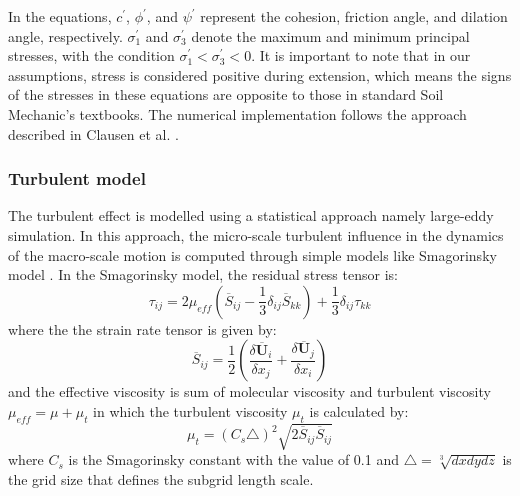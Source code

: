 \documentclass[preprint,12pt]{elsarticle}
\begin{document}
%
%
In the equations, $c^{\prime}$, $\phi^{\prime}$, and $\psi^{\prime}$ represent the cohesion, friction angle, and dilation angle, respectively. $\sigma_1^{\prime}$ and $\sigma_3^{\prime}$ denote the maximum and minimum principal stresses, with the condition $\sigma_1^{\prime}<\sigma_3^{\prime}<0$. It is important to note that in our assumptions, stress is considered positive during extension, which means the signs of the stresses in these equations are opposite to those in standard Soil Mechanic's textbooks. The numerical implementation follows the approach described in Clausen et al. \cite{Clausen}.
\subsubsection{Turbulent model}
The turbulent effect is modelled using a statistical approach namely large-eddy simulation. In this approach, the micro-scale turbulent influence in the dynamics of the macro-scale motion is computed through simple models like Smagorinsky model \cite{Moin}. In the Smagorinsky model, the residual stress tensor is:
%
\begin{equation}
     \tau_{ij} = 2 \mu_{eff} (\overline{S}_{ij} - \frac{1}{3} \delta_{ij} \overline{S}_{kk}) + \frac{1}{3} \delta_{ij} \tau_{kk}
\end {equation}
%
%
where the the strain rate tensor is given by:
%
\begin{equation}
     \overline{S}_{ij} = \frac{1}{2} (\frac{\delta \overline{\pmb{U}}_i}{\delta x_j} + \frac{\delta \overline{\pmb{U}}_j}{\delta x_i})
\end {equation}
%
%
and the effective viscosity is sum of molecular viscosity and turbulent viscosity $\mu_{eff} = \mu + \mu_t$ in which the turbulent viscosity $\mu_t$ is calculated by:
%
\begin{equation}
    \mu_t = (C_s \triangle)^2 \sqrt{2 \overline{S}_{ij} \overline{S}_{ij}}
\end {equation}
%
%
where $C_s$ is the Smagorinsky constant with the value of 0.1 and $\triangle = \sqrt[3]{dx dy dz}$ is the grid size that defines the subgrid length scale.
\end{document}
